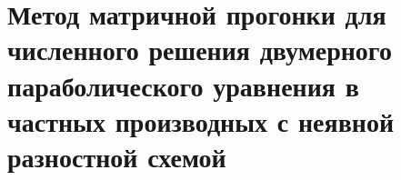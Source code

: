 \documentclass[__main__.tex]{subfiles}
\begin{document}
\section{Метод матричной прогонки для численного решения двумерного параболического уравнения в частных производных с неявной разностной схемой}
\end{document}
